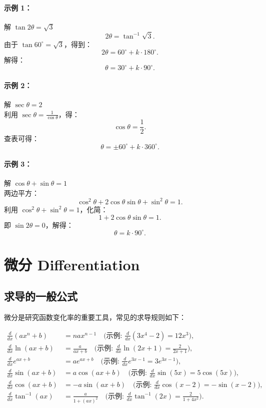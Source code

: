\documentclass[8pt,a4paper,twoside]{tau-class/tau}
\begin{document}
\paragraph{示例 1：} 解 \(\tan 2\theta=\sqrt{3}\)
\[
  2\theta=\tan^{−1}\sqrt{3}.
\]
由于 \(\tan 60^\circ=\sqrt{3}\)，得到：
\[
  2\theta=60^\circ+k\cdot180^\circ.
\]
解得：
\[
  \theta=30^\circ+k\cdot90^\circ.
\]

\paragraph{示例 2：} 解 \(\sec\theta=2\)\\
利用 \(\sec\theta=\frac{1}{\cos\theta}\)，得：
\[
  \cos\theta=\frac{1}{2}.
\]
查表可得：
\[
  \theta=\pm60^\circ+k\cdot360^\circ.
\]

\paragraph{示例 3：} 解 \(\cos\theta+\sin\theta=1\)\\
两边平方：
\[
  \cos^2\theta+2\cos\theta\sin\theta+\sin^2\theta=1.
\]
利用 \(\cos^2\theta+\sin^2\theta=1\)，化简：
\[
  1+2\cos\theta\sin\theta=1.
\]
即 \(\sin2\theta=0\)，解得：
\[
  \theta=k\cdot90^\circ.
\]

\newpage
\section{微分 Differentiation}

\subsection{求导的一般公式}
微分是研究函数变化率的重要工具，常见的求导规则如下：

\begin{tcolorbox}[enhanced, breakable, boxsep=1pt, colframe=blue!50!black, colback=white, fonttitle=\footnotesize, fontupper=\footnotesize, title=常见函数的导数]
\begin{align*}
    \frac{d}{dx} (ax^n + b) &= nax^{n−1}\quad\text{(示例: }\frac{d}{dx}(3x^4 − 2) = 12x^3\text{)},\\
    \frac{d}{dx} \ln(ax + b) &= \frac{a}{ax+b}\quad\text{(示例: }\frac{d}{dx}\ln(2x+1) = \frac{2}{2x+1}\text{)},\\
    \frac{d}{dx} e^{ax+b} &= ae^{ax+b}\quad\text{(示例: }\frac{d}{dx} e^{3x−1} = 3e^{3x−1}\text{)},\\
    \frac{d}{dx} \sin(ax+b) &= a\cos(ax+b)\quad\text{(示例: }\frac{d}{dx} \sin(5x) = 5 \cos(5x)\text{)},\\
    \frac{d}{dx} \cos(ax+b) &= −a\sin(ax+b)\quad\text{(示例: }\frac{d}{dx} \cos(x−2) = −\sin(x−2)\text{)},\\
    \frac{d}{dx} \tan^{−1}(ax) &= \frac{a}{1 + (ax)^2}\quad\text{(示例: }\frac{d}{dx} \tan^{−1}(2x) = \frac{2}{1 + 4x^2}\text{)}.
\end{align*}
\end{tcolorbox}
\end{document}
